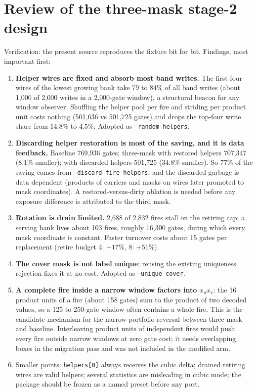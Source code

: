 \documentclass[11pt,a4paper]{article}
\newcommand{\code}[1]{\texttt{#1}}
\begin{document}
\section{Review of the three-mask stage-2 design}
Verification: the present source reproduces the fixture bit for bit. Findings, most important first:
\begin{enumerate}
\item \textbf{Helper wires are fixed and absorb most band writes.} The first four wires of the lowest growing bank take 79 to 84\% of all band writes (about 1{,}000 of 2{,}000 writes in a 2{,}000-gate window), a structural beacon for any window observer. Shuffling the helper pool per fire and striding per product unit costs nothing (501{,}636 vs 501{,}725 gates) and drops the top-four write share from 14.8\% to 4.5\%. Adopted as \code{--random-helpers}.
\item \textbf{Discarding helper restoration is most of the saving, and it is data feedback.} Baseline 769{,}936 gates; three-mask with restored helpers 707{,}347 (8.1\% smaller); with discarded helpers 501{,}725 (34.8\% smaller). So 77\% of the saving comes from \code{--discard-fire-helpers}, and the discarded garbage is data dependent (products of carriers and masks on wires later promoted to mask coordinates). A restored-versus-dirty ablation is needed before any exposure difference is attributed to the third mask.
\item \textbf{Rotation is drain limited.} 2{,}688 of 2{,}832 fires stall on the retiring cap; a serving bank lives about 103 fires, roughly 16{,}300 gates, during which every mask coordinate is constant. Faster turnover costs about 15 gates per replacement (retire budget 4: $+17\%$, 8: $+51\%$).
\item \textbf{The cover mask is not label unique}; reusing the existing uniqueness rejection fixes it at no cost. Adopted as \code{--unique-cover}.
\item \textbf{A complete fire inside a narrow window factors into $x_u x_v$}: the 16 product units of a fire (about 158 gates) sum to the product of two decoded values, so a 125 to 250-gate window often contains a whole fire. This is the candidate mechanism for the narrow-portfolio reversal between three-mask and baseline. Interleaving product units of independent fires would push every fire outside narrow windows at zero gate cost; it needs overlapping boxes in the migration pass and was not included in the modified arm.
\item Smaller points: \code{helpers[0]} always receives the cubic delta; drained retiring wires are valid helpers; several statistics are misleading in cubic mode; the package should be frozen as a named preset before any port.
\end{enumerate}
\end{document}
